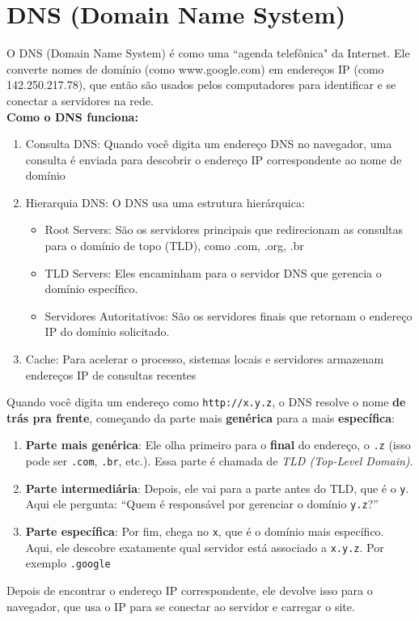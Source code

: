 \documentclass{article}
\begin{document}
\section{DNS (Domain Name System)}
O DNS (Domain Name System) é como uma ``agenda telefônica" da Internet. Ele converte nomes de domínio (como www.google.com) em endereços IP (como 142.250.217.78), que então são usados pelos computadores para identificar e se conectar a servidores na rede.
\\[10pt]
\textbf{Como o DNS funciona:}
\begin{enumerate}
    \item Consulta DNS: Quando você digita um endereço DNS no navegador, uma consulta é enviada para descobrir o endereço IP correspondente ao nome de domínio
    
    \item Hierarquia DNS: O DNS usa uma estrutura hierárquica:
    \begin{itemize}
        \item Root Servers: São os servidores principais que redirecionam as consultas para o domínio de topo (TLD), como .com, .org, .br
        \item TLD Servers: Eles encaminham para o servidor DNS que gerencia o domínio específico.
        \item Servidores Autoritativos: São os servidores finais que retornam o endereço IP do domínio solicitado.
    \end{itemize}
    
    \item Cache: Para acelerar o processo, sistemas locais e servidores armazenam endereços IP de consultas recentes
\end{enumerate}
Quando você digita um endereço como \texttt{http://x.y.z}, o DNS resolve o nome \textbf{de trás pra frente}, começando da parte mais \textbf{genérica} para a mais \textbf{específica}:

\begin{enumerate}
    \item \textbf{Parte mais genérica}:  
    Ele olha primeiro para o \textbf{final} do endereço, o \texttt{.z} (isso pode ser \texttt{.com}, \texttt{.br}, etc.). Essa parte é chamada de \textit{TLD (Top-Level Domain)}.
    
    \item \textbf{Parte intermediária}:  
    Depois, ele vai para a parte antes do TLD, que é o \texttt{y}. Aqui ele pergunta: “Quem é responsável por gerenciar o domínio \texttt{y.z}?”
    
    \item \textbf{Parte específica}:  
    Por fim, chega no \texttt{x}, que é o domínio mais específico. Aqui, ele descobre exatamente qual servidor está associado a \texttt{x.y.z}. Por exemplo \texttt{.google}
\end{enumerate}
Depois de encontrar o endereço IP correspondente, ele devolve isso para o navegador, que usa o IP para se conectar ao servidor e carregar o site.
\end{document}
